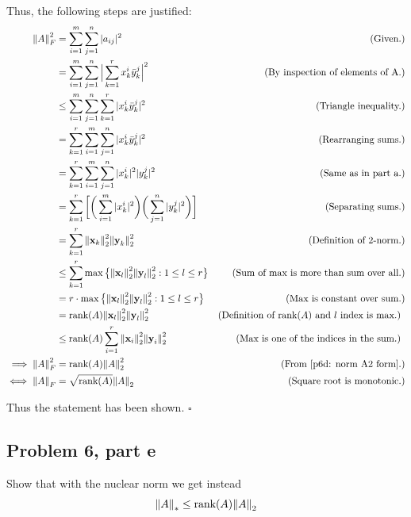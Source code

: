 \begin{solution}
    \newpage
    Thus, the following steps are justified:
    \alignbreak
    \begin{align}
        \norm{A}_F^2 &= \sum_{i = 1}^m\sum_{j = 1}^n |a_{ij}|^2 &\text{(Given.)}\nonumber\\
        &= \sum_{i = 1}^m\sum_{j = 1}^n \Big| \sum_{k = 1}^r x_k^i\Bar{y}_k^j\Big|^2 &\text{(By inspection of elements of A.)}\nonumber\\
        &\leq \sum_{i = 1}^m\sum_{j = 1}^n\sum_{k = 1}^r|x^i_k\Bar{y}_k^j|^2 &\text{(Triangle inequality.)}\nonumber\\
        &= \sum_{k = 1}^r\sum_{i = 1}^m\sum_{j = 1}^n|x^i_k\Bar{y}_k^j|^2 &\text{(Rearranging sums.)}\nonumber\\
        &= \sum_{k = 1}^r\sum_{i = 1}^m\sum_{j = 1}^n |x_k^i|^2|y_k^j|^2 &\text{(Same as in part a.)}\nonumber\\
        &= \sum_{k = 1}^r \bigg[ \bigg( \sum_{i = 1}^m |x_k^i|^2\bigg)\bigg( \sum_{j = 1}^n|y_k^j|^2 \bigg)\bigg] &\text{(Separating sums.)}\nonumber\\
        &= \sum_{k = 1}^r\norm{\textbf{x}_k}_2^2\norm{\textbf{y}_k}_2^2 &\text{(Definition of $2$-norm.)}\nonumber\\
        &\leq \sum_{k = 1}^r \max\big\{\norm{\textbf{x}_l}_2^2\norm{\textbf{y}_l}_2^2 : 1 \leq l \leq r\big\} &\text{(Sum of max is more than sum over all.)}\nonumber\\
        &= r \cdot \max\big\{\norm{\textbf{x}_l}_2^2\norm{\textbf{y}_l}_2^2 : 1 \leq l \leq r\big\} &\text{(Max is constant over sum.)}\nonumber\\
        &= \text{rank}(A)\norm{\textbf{x}_l}_2^2\norm{\textbf{y}_l}_2^2 &\text{(Definition of rank$(A)$ and $l$ index is max.) }\nonumber\\
        &\leq \text{rank}(A)\sum_{i = 1}^r\norm{\textbf{x}_i}_2^2\norm{\textbf{y}_i}_2^2 &\text{(Max is one of the indices in the sum.) }\nonumber\\
        \implies \norm{A}_F^2 &= \text{rank}(A) \norm{A}_2^2&\text{(From \ref{p6d: norm A2 form}.)}\nonumber\\
        \iff \norm{A}_F &= \sqrt{\text{rank}(A)} \norm{A}_2 &\text{(Square root is monotonic.)}\nonumber
    \end{align}
    \alignbreak

    Thus the statement has been shown. $\square$
\end{solution}

\newpage
\subsection{Problem 6, part e}
Show that with the nuclear norm we get instead
\[
\norm{A}_* \leq \text{rank}(A)\norm{A}_2
\]

